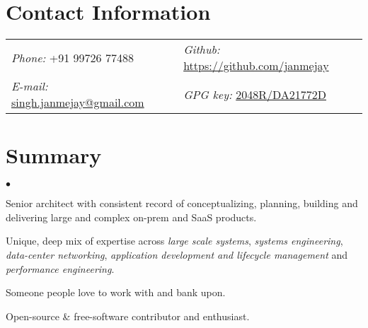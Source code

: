 \documentclass[margin,line]{res}
\newenvironment{list2}{
  \begin{list}{$\bullet$}{%
      \setlength{\itemsep}{0in}
      \setlength{\parsep}{0in} \setlength{\parskip}{0in}
      \setlength{\topsep}{0in} \setlength{\partopsep}{0in} 
      \setlength{\leftmargin}{0.2in}}}{\end{list}}
\begin{document}

\begin{resume}
  \section{\sc Contact Information}
  \vspace{.05in}
  \begin{tabular}{@{}p{3.3in}p{3.3in}}
    {\it Phone:}   +91 99726 77488                                                   &  {\it Github:}  \url{https://github.com/janmejay} \\     
    {\it E-mail:}  \href{mailto:singh.janmejay@gmail.com}{singh.janmejay@gmail.com}  &  {\it GPG key:} \href{http://pgp.mit.edu:11371/pks/lookup?op=vindex&search=0x3A9F2343DA21772D}{2048R/DA21772D}\\
  \end{tabular}

\section{\sc Summary}
\vspace{.6cm}
\begin{list2}
\item Senior architect with consistent record of conceptualizing, planning, building and delivering large and complex on-prem and SaaS products.
  \vspace{.1cm}
\item Unique, deep mix of expertise across {\it large scale systems}, {\it systems engineering}, {\it data-center networking}, {\it application development and lifecycle management} and {\it performance engineering}.
  \vspace{.1cm}
\item Someone people love to work with and bank upon.
  \vspace{.1cm}
\item Open-source \& free-software contributor and enthusiast.
\end{list2}


\end{resume}
\end{document}
